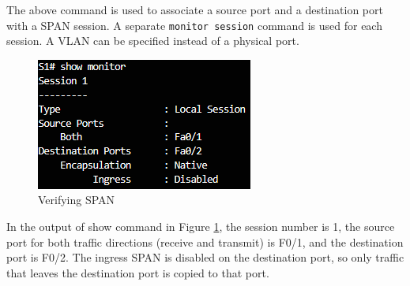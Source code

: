 The above command is used to associate a source port and a destination port with a SPAN session. A separate \verb|monitor session| command is used for each session. A VLAN can be specified instead of a physical port.

\begin{figure}[hbtp]
\caption{Verifying SPAN}\label{SPAN}
\centering
\includegraphics[scale=0.8]{pictures/SPAN.PNG}
\end{figure}

In the output of show command in Figure \ref{SPAN}, the session number is 1, the source port for both traffic directions (receive and transmit) is F0/1, and the destination port is F0/2. The ingress SPAN is disabled on the destination port, so only traffic that leaves the destination port is copied to that port.

